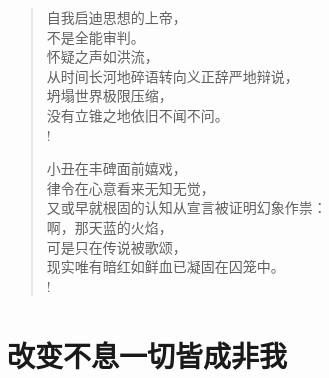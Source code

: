 \documentclass[UTF8, 12pt, a4paper]{ctexrep} %
\begin{document}
\begin{verse}
    自我启迪思想的上帝，\\
    不是全能审判。\\
    怀疑之声如洪流，\\
    从时间长河地碎语转向义正辞严地辩说，\\
    坍塌世界极限压缩，\\
    没有立锥之地依旧不闻不问。\\!

    小丑在丰碑面前嬉戏，\\
    律令在心意看来无知无觉，\\
    又或早就根固的认知从宣言被证明幻象作祟：\\
    啊，那天蓝的火焰，\\
    可是只在传说被歌颂，\\
    现实唯有暗红如鲜血已凝固在囚笼中。\\!

\end{verse}
\newpage

\section*{改变不息一切皆成非我}
\newpage
\end{document}
